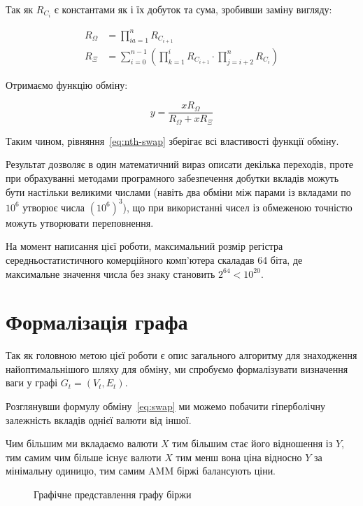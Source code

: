 \documentclass[14pt]{extarticle}
\begin{document}
Так як $R_{C_{i}}$ є константами як і їх добуток та сума, зробивши заміну вигляду:

\begin{equation}\label{eq:swap-omega-xi}
\begin{aligned}
  R_{\Omega} &= \prod_{ia=1}^n R_{C_{i+1}} \\
  R_{\Xi} &= \sum_{i=0}^{n-1} \left( \prod_{k=1}^i R_{C_{i+1}} \cdot \prod_{j=i+2}^{n}  R_{C_{i}} \right)
\end{aligned}
\end{equation}

Отримаємо функцію обміну:

\begin{equation*}
y = \frac{x R_{\Omega}}{R_{\Omega} + x R_{\Xi}}
\end{equation*}

Таким чином, рівняння~\eqref{eq:nth-swap} зберігає всі властивості функції
обміну.

Результат дозволяє в один математичний вираз описати декілька переходів, проте
при обрахуванні методами програмного забезпечення добутки вкладів можуть бути
настільки великими числами (навіть два обміни між парами із вкладами по \(10^6\)
утворює числа \({(10^6)}^3\)), що при використанні чисел із обмеженою точністю
можуть утворювати переповнення.

На момент написання цієї роботи, максимальний розмір регістра
середньостатистичного комерційного комп'ютера скаладав 64 біта, де максимальне
значення числа без знаку становить \(2^{64} < 10^{20}\).

\newpage

\section{Формалізація графа}

Так як головною метою цієї роботи є опис загального алгоритму для знаходження
найоптимальнішого шляху для обміну, ми спробуємо формалізувати визначення ваги у
графі \(G_{t} = (V_{t}, E_{t})\).

Розглянувши формулу обміну~\eqref{eq:swap} ми можемо побачити гіперболічну
залежність вкладів однієї валюти від іншої.

Чим більшим ми вкладаємо валюти \(X\) тим більшим стає його відношення із \(Y\),
тим самим чим більше існує валюти \(X\) тим менш вона ціна відносно \(Y\) за
мінімальну одиницю, тим самим AMM біржі балансують ціни.

\begin{figure}[h]
	\centering
	\caption{Графічне представлення графу біржи}\label{fig:amm-graph}
\end{figure}
\end{document}
